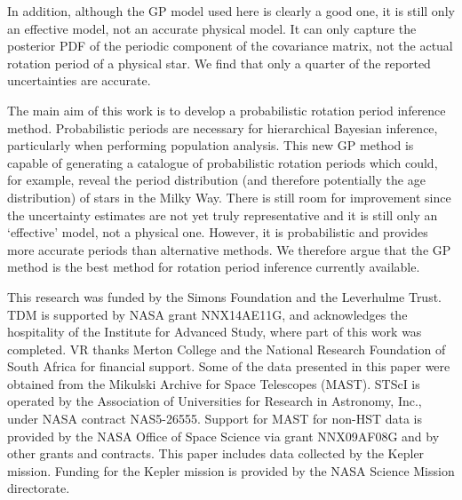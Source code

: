 \documentclass[useAMS, usenatbib, preprint, 12pt]{aastex}
\begin{document}
In addition, although the GP model used here is clearly a good one, it is
still only an effective model, not an accurate physical model.
It can only capture the posterior PDF of the periodic component of the
covariance matrix, not the actual rotation period of a physical star.
We find that only a quarter of the reported uncertainties are accurate.

The main aim of this work is to develop a probabilistic rotation period
inference method.
Probabilistic periods are necessary for hierarchical Bayesian inference,
particularly when performing population analysis.
This new GP method is capable of generating a catalogue of probabilistic
rotation periods which could, for example, reveal the period distribution
(and therefore potentially the age distribution) of stars in the Milky Way.
There is still room for improvement since the uncertainty estimates are not
yet truly representative and it is still only an `effective' model, not a
physical one.
However, it is probabilistic and provides more accurate periods than
alternative methods.
We therefore argue that the GP method is the best method for rotation period
inference currently available.

This research was funded by the Simons Foundation and the Leverhulme Trust.
TDM is supported by NASA grant NNX14AE11G, and acknowledges the
hospitality of the Institute for Advanced Study,
where part of this work was completed.
VR thanks Merton College and the National Research Foundation of South Africa
for financial support.
Some of the data presented in this paper were obtained from the Mikulski
Archive for Space Telescopes (MAST).
STScI is operated by the Association of Universities for Research in
Astronomy, Inc., under NASA contract NAS5-26555.
Support for MAST for non-HST data is provided by the NASA Office of Space
Science via grant NNX09AF08G and by other grants and contracts.
This paper includes data collected by the Kepler mission. Funding for the
Kepler mission is provided by the NASA Science Mission directorate.



\end{document}
